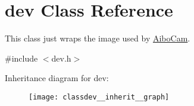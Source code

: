 \hypertarget{classdev}{
\section{dev Class Reference}
\label{classdev}
}


This class just wraps the image used by \hyperlink{classAiboCam}{AiboCam}.  




{\ttfamily \#include $<$dev.h$>$}



Inheritance diagram for dev:\nopagebreak
\begin{figure}[H]
\begin{center}
\leavevmode
\texttt{[image: classdev\_\_inherit\_\_graph]}
\end{center}
\end{figure}
